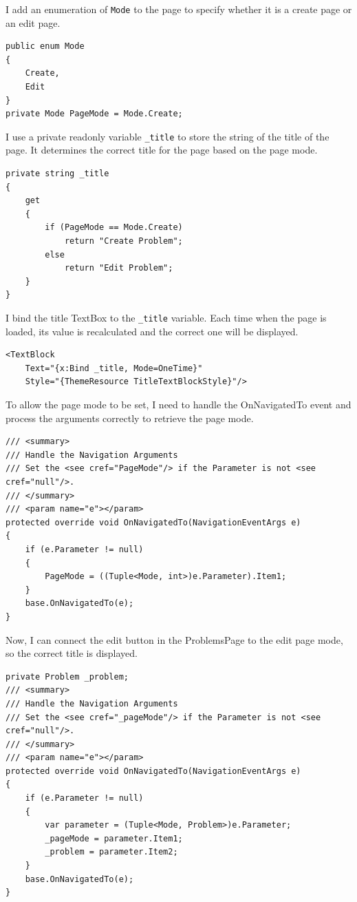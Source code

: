 \documentclass[a4paper]{report}
\newcommand{\code}{\texttt}
\begin{document}
I add an enumeration of \code{Mode} to the page to specify whether it is a create page or an edit page.

\begin{verbatim}
public enum Mode
{
    Create,
    Edit
}
private Mode PageMode = Mode.Create;
\end{verbatim}

I use a private readonly variable \code{_title} to store the string of the title of the page. It determines the correct title for the page based on the page mode.

\begin{verbatim}
private string _title
{
    get
    {
        if (PageMode == Mode.Create)
            return "Create Problem";
        else
            return "Edit Problem";
    }
}
\end{verbatim}

I bind the title TextBox to the \code{_title} variable. Each time when the page is loaded, its value is recalculated and the correct one will be displayed.

\begin{verbatim}
<TextBlock
    Text="{x:Bind _title, Mode=OneTime}"
    Style="{ThemeResource TitleTextBlockStyle}"/>
\end{verbatim}

To allow the page mode to be set, I need to handle the OnNavigatedTo event and process the arguments correctly to retrieve the page mode.

\begin{verbatim}
/// <summary>
/// Handle the Navigation Arguments
/// Set the <see cref="PageMode"/> if the Parameter is not <see cref="null"/>.
/// </summary>
/// <param name="e"></param>
protected override void OnNavigatedTo(NavigationEventArgs e)
{
    if (e.Parameter != null)
    {
        PageMode = ((Tuple<Mode, int>)e.Parameter).Item1;
    }
    base.OnNavigatedTo(e);
}
\end{verbatim}

Now, I can connect the edit button in the ProblemsPage to the edit page mode, so the correct title is displayed.

\begin{verbatim}
private Problem _problem;
/// <summary>
/// Handle the Navigation Arguments
/// Set the <see cref="_pageMode"/> if the Parameter is not <see cref="null"/>.
/// </summary>
/// <param name="e"></param>
protected override void OnNavigatedTo(NavigationEventArgs e)
{
    if (e.Parameter != null)
    {
        var parameter = (Tuple<Mode, Problem>)e.Parameter;
        _pageMode = parameter.Item1;
        _problem = parameter.Item2;
    }
    base.OnNavigatedTo(e);
}
\end{verbatim}
\end{document}
